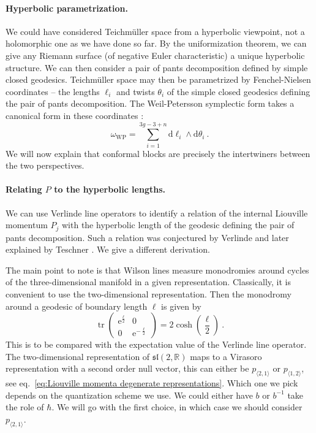 \documentclass[12pt,a4paper]{article}
\newcommand{\be}{\begin{equation}}
\newcommand{\ee}{\end{equation}}
\DeclareMathOperator\tr{tr}
\renewcommand\d{\text{d}}
\newcommand\RR{\mathbb{R}}
\begin{document}
\paragraph{Hyperbolic parametrization.} We could have considered Teichm\"uller space from a hyperbolic viewpoint, not a holomorphic one as we have done so far. By the uniformization theorem, we can give any Riemann surface (of negative Euler characteristic) a unique hyperbolic structure. We can then consider a pair of pants decomposition defined by simple closed geodesics. Teichm\"uller space may then be parametrized by Fenchel-Nielsen coordinates -- the lengths $\ell_i$ and twists $\theta_i$  of the simple closed geodesics defining the pair of pants decomposition. The Weil-Petersson symplectic form takes a canonical form in these coordinates \cite{Wolpert:Fenchel, Wolpert:Symplectic}:
\be 
\omega_\text{WP}=\sum_{i=1}^{3g-3+n} \d \ell_i \wedge \d \theta_i\ . \label{eq:Weil-Petersson form Fenchel-Nielsen coordinates}
\ee
We will now explain that conformal blocks are precisely the intertwiners between the two perspectives.

\paragraph{Relating $P$ to the hyperbolic lengths.}
We can use Verlinde line operators to identify a relation of the internal Liouville momentum $P_j$ with the hyperbolic length of the geodesic defining the pair of pants decomposition. Such a relation was conjectured by Verlinde \cite{Verlinde:1989ua} and later explained by Teschner \cite{Teschner:2003at}. We give a different derivation.

The main point to note is that Wilson lines measure monodromies around cycles of the three-dimensional manifold in a given representation. Classically, it is convenient to use the two-dimensional representation. Then the monodromy around a geodesic of boundary length $\ell$ is given by
\be 
\tr \begin{pmatrix}
    \mathrm{e}^{\frac{\ell}{2}} & 0 \\ 0 & \mathrm{e}^{-\frac{\ell}{2}} 
\end{pmatrix}=2 \cosh\left(\frac{\ell}{2}\right)\ .
\ee
This is to be compared with the expectation value of the Verlinde line operator. The two-dimensional representation of $\mathfrak{sl}(2,\RR)$ maps to a Virasoro representation with a second order null vector, this can either be $p_{\langle 2,1 \rangle}$ or $p_{\langle 1,2 \rangle}$, see eq.~\eqref{eq:Liouville momenta degenerate representations}. Which one we pick depends on the quantization scheme we use. We could either have $b$ or $b^{-1}$ take the role of $\hbar$. We will go with the first choice, in which case we should consider $p_{\langle 2,1 \rangle}$.
\end{document}
